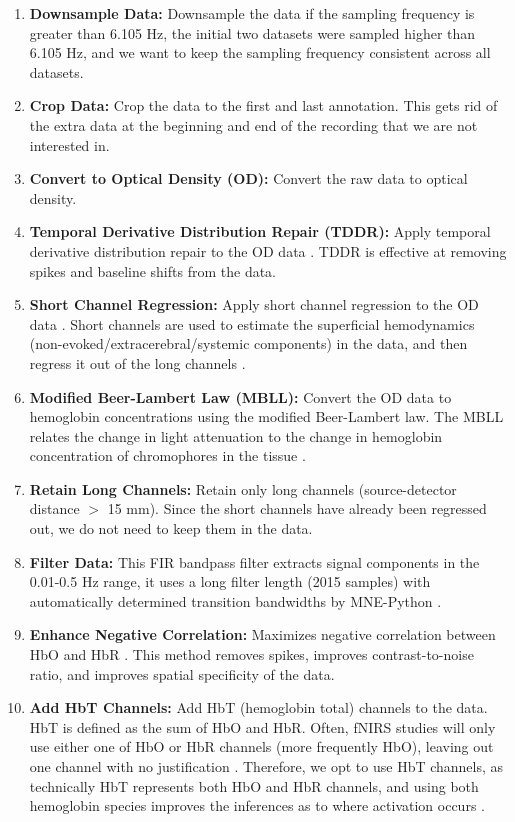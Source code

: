 \begin{enumerate}
    \item \textbf{Downsample Data:} Downsample the data if the sampling frequency is greater than 6.105 Hz, the initial two datasets were sampled higher than 6.105 Hz, and we want to keep the sampling frequency consistent across all datasets.
    \item \textbf{Crop Data:} Crop the data to the first and last annotation. This gets rid of the extra data at the beginning and end of the recording that we are not interested in.
    \item \textbf{Convert to Optical Density (OD):} Convert the raw data to optical density.
    \item \textbf{Temporal Derivative Distribution Repair (TDDR):} Apply temporal derivative distribution repair to the OD data \citep{fishburn_temporal_2019}. TDDR is effective at removing spikes and baseline shifts from the data. 
    \item \textbf{Short Channel Regression:} Apply short channel regression to the OD data \citep{scholkmann_measuring_2014}. Short channels are used to estimate the superficial hemodynamics (non-evoked/extracerebral/systemic components) in the data, and then regress it out of the long channels \citep{tachtsidis_false_2016}. 
    \item \textbf{Modified Beer-Lambert Law (MBLL):} Convert the OD data to hemoglobin concentrations using the modified Beer-Lambert law. The MBLL relates the change in light attenuation to the change in hemoglobin concentration of chromophores in the tissue \citep{kocsis_modified_2006}.
    \item \textbf{Retain Long Channels:} Retain only long channels (source-detector distance $>$ 15 mm). Since the short channels have already been regressed out, we do not need to keep them in the data.
    \item \textbf{Filter Data:} This FIR bandpass filter extracts signal components in the 0.01-0.5 Hz range, it uses a long filter length (2015 samples) with automatically determined transition bandwidths by MNE-Python \citep{pinti_current_2019}. 
    \item \textbf{Enhance Negative Correlation:} Maximizes negative correlation between HbO and HbR \citep{cui_functional_2010}. This method removes spikes, improves contrast-to-noise ratio, and improves spatial specificity of the data.
    \item \textbf{Add HbT Channels:} Add HbT (hemoglobin total) channels to the data. HbT is defined as the sum of HbO and HbR. Often, fNIRS studies will only use either one of HbO or HbR channels (more frequently HbO), leaving out one channel with no justification \citep{kinder_systematic_2022}. Therefore, we opt to use HbT channels, as technically HbT represents both HbO and HbR channels, and using both hemoglobin species improves the inferences as to where activation occurs \cite{hocke_automated_2018}.
\end{enumerate}
